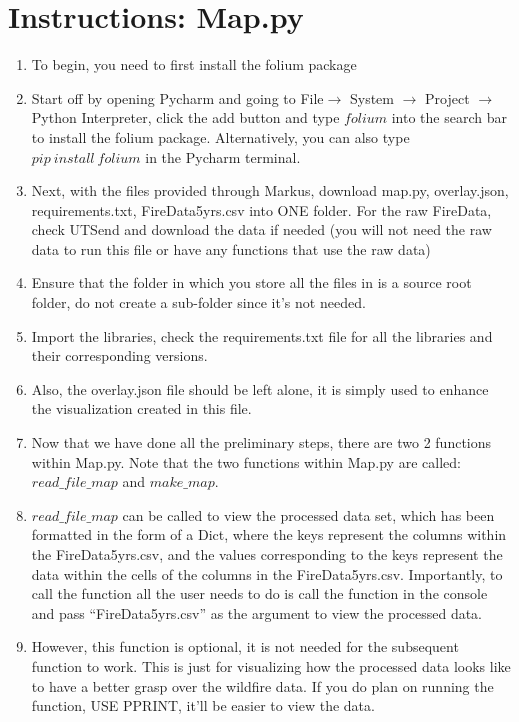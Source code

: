\documentclass[fontsize=11pt]{article}
\begin{document}
\section*{Instructions: Map.py}
\begin{enumerate}
    \item To begin, you need to first install the folium package 
    \item Start off by opening Pycharm and going to File$\rightarrow$ System $\rightarrow$ Project $\rightarrow$ Python Interpreter, click the add button and type $folium$ into the search bar to install the folium package. Alternatively, you can also type $pip ~ install ~ folium$ in the Pycharm terminal.
    \item Next, with the files provided through Markus, download map.py, overlay.json, requirements.txt, FireData5yrs.csv into ONE folder. For the raw FireData, check UTSend and download the data if needed (you will not need the raw data to run this file or have any functions that use the raw data)
    \item Ensure that the folder in which you store all the files in is a source root folder, do not create a sub-folder since it’s not needed.
    \item Import the libraries, check the requirements.txt file for all the libraries and their corresponding versions.
    \item Also, the overlay.json file should be left alone, it is simply used to enhance the visualization created in this file.
    \item Now that we have done all the preliminary steps, there are two 2 functions within Map.py. Note that the two functions within Map.py are called: $read\_file\_map$ and $make\_map$.
    \item $read\_file\_map$ can be called to view the processed data set, which has been formatted in the form of a Dict, where the keys represent the columns within the FireData5yrs.csv, and the values corresponding to the keys represent the data within the cells of the columns in the FireData5yrs.csv. Importantly, to call the function all the user needs to do is call the function in the console and pass “FireData5yrs.csv” as the argument to view the processed data. 
    \item However, this function is optional, it is not needed for the subsequent function to work. This is just for visualizing how the processed data looks like to have a better grasp over the wildfire data. If you do plan on running the function, USE PPRINT, it’ll be easier to view the data. 

\end{enumerate}
\end{document}

